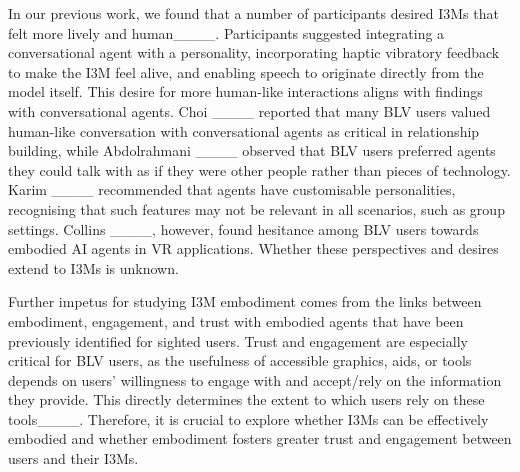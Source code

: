 In our previous work, we found that a number of participants desired I3Ms that felt more lively and human____. Participants suggested integrating a conversational agent with a personality, incorporating haptic vibratory feedback to make the I3M feel alive, and enabling speech to originate directly from the model itself. This desire for more human-like interactions aligns with findings with conversational agents. Choi \etal____ reported that many BLV users valued human-like conversation with conversational agents as critical in relationship building, while Abdolrahmani \etal____ observed that BLV users preferred agents they could talk with as if they were other people rather than pieces of technology. Karim \etal____ recommended that agents have customisable personalities, recognising that such features may not be relevant in all scenarios, such as group settings. Collins \etal____, however, found hesitance among BLV users towards embodied AI agents in VR applications. Whether these perspectives and desires extend to I3Ms is unknown.

Further impetus for studying I3M embodiment comes from the links between embodiment, engagement, and trust with embodied agents that have been previously identified for sighted users. Trust and engagement are especially critical for BLV users, as the usefulness of accessible graphics, aids, or tools depends on users' willingness to engage with and accept/rely on the information they provide. This directly determines the extent to which users rely on these tools____. Therefore, it is crucial to explore whether I3Ms can be effectively embodied and whether embodiment fosters greater trust and engagement between users and their I3Ms.